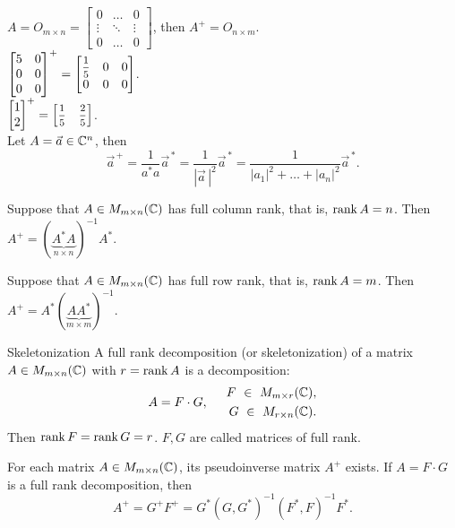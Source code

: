     \Ex $A = O_{m\times n} = \begin{bmatrix}
        0 & \ldots & 0\\
        \vdots & \ddots & \vdots\\
        0 & \ldots & 0
    \end{bmatrix}$, then $A^+ = O_{n\times m}$.\\
    \Ex $\begin{bmatrix}
        5 & 0 \\
        0 & 0 \\
        0 & 0
    \end{bmatrix}^+ = \displaystyle\begin{bmatrix}
        \medmath{\frac{1}{5}} & 0 & 0\\
        0 & 0 & 0
    \end{bmatrix}$.\\
    \Ex $\begin{bmatrix}
        1 \\ 2
    \end{bmatrix}^+ = \begin{bmatrix}
        \medmath{\frac{1}{5}} & \medmath{\frac{2}{5}}
    \end{bmatrix}$.\\
    \Ex Let $A = \vec{a} \in \mathbb{C}^n$, then
    \[\vec{a}^{\, +} = \dfrac{1}{a^*a}\vec{a}^{\, *} 
                     = \dfrac{1}{|\vec{a}\,|^2}\vec{a}^{\, *}
                     = \dfrac{1}{|a_1|^2 + \ldots + |a_n|^2} \vec{a}^{\, *}.\]
    \begin{proposition}{}{}
        Suppose that $A \in M_{m\times n}(\mathbb{C})$ has full column rank, that is, $\operatorname{rank} A = n$. Then
        $A^+ = (\underbrace{A^*A}_{n\times n})^{-1}A^*.$
    \end{proposition}
    \begin{proposition}{}{}
        Suppose that $A \in M_{m\times n}(\mathbb{C})$ has full row rank, that is, $\operatorname{rank} A = m$. Then $A^+ = A^* (\underbrace{AA^*}_{m\times m})^{-1}.$
    \end{proposition}
    
    \begin{definition}{Skeletonization}{}
        A full rank decomposition (or skeletonization) of a matrix $A \in M_{m\times n}(\mathbb{C})$ with $r = \operatorname{rank} A$ is a decomposition:
        \[
            A = F \cdot G, \hspace*{0.5cm} \begin{aligned}
                F\ \in \ M_{m\times r}(\mathbb{C}),\\
                G\ \in \ M_{r\times n}(\mathbb{C}).
            \end{aligned}  
        \]
        Then $\operatorname{rank} F = \operatorname{rank} G = r$. $F, G$ are called matrices of full rank.
    \end{definition}
    \begin{theorema}{}{}
        For each matrix $A \in M_{m\times n}(\mathbb{C})$, its pseudoinverse matrix $A^+$ exists. If $A = F \cdot G$ is a full rank decomposition, then
        \[
            A^+ = G^+F^+ = G^*\left(G,G^*\right)^{-1} \left(F^*, F\right)^{-1}F^*. 
        \]
    \end{theorema}
